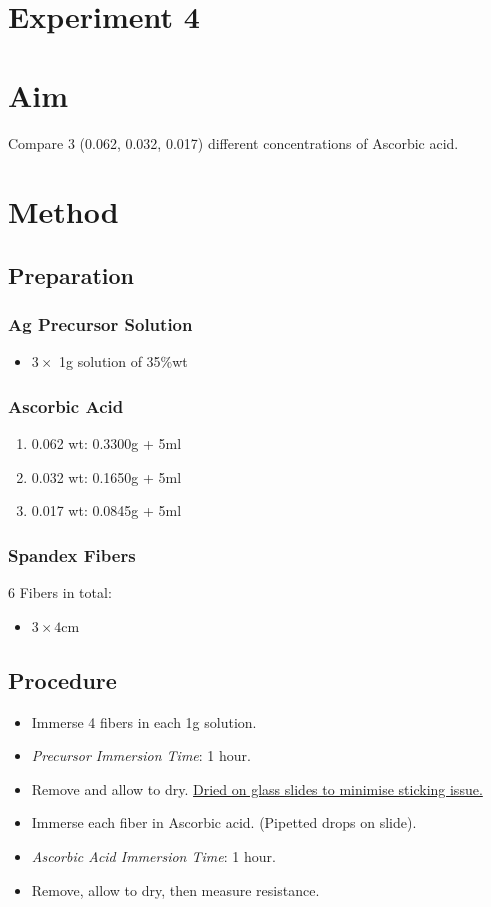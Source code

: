 \documentclass{article}
\begin{document}
\section*{Experiment 4}

\section{Aim}
Compare 3 (0.062, 0.032, 0.017) different concentrations of Ascorbic acid. 

\section{Method}
\subsection{Preparation}
\subsubsection{Ag Precursor Solution}
\begin{itemize}
    \item $3\times$ 1g solution of  35\%wt
\end{itemize}

\subsubsection{Ascorbic Acid}
\begin{enumerate}
    \item 0.062 wt: 0.3300g + 5ml
    \item 0.032 wt: 0.1650g + 5ml
    \item 0.017 wt: 0.0845g +  5ml
\end{enumerate}

\subsubsection{Spandex Fibers}
6 Fibers in total:
\begin{itemize}
    \item $3\times 4$cm
\end{itemize}

\subsection{Procedure}
\begin{itemize}
    \item Immerse 4 fibers in each 1g solution.
    \item \textit{Precursor Immersion Time}: 1 hour.
    \item Remove and allow to dry. \underline{Dried on glass slides to minimise sticking issue.}
    \item Immerse each fiber in Ascorbic acid. (Pipetted drops on slide).
    \item \textit{Ascorbic Acid Immersion Time}: 1 hour.
    \item Remove, allow to dry, then measure resistance.
\end{itemize}
\end{document}
